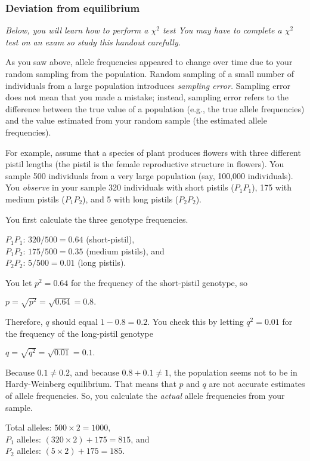 \documentclass[12pt]{exam}
\begin{document}
\begin{questions}
\subsubsection*{Deviation from equilibrium}

\emph{Below, you will learn how to perform a $\chi^2$ test You may have to complete a $\chi^2$ test on an exam so study this handout carefully.}

As you saw above, allele frequencies appeared to change over time due to your random sampling from the population. Random sampling of a small number of individuals from a large population introduces \emph{sampling error.} Sampling error does not mean that you made a mistake; instead, sampling error refers to the difference between the true value of a population (e.g., the true allele frequencies) and the value estimated from your random sample (the estimated allele frequencies). 

For example, assume that a species of plant produces flowers with three different pistil lengths (the pistil is the female reproductive structure in flowers). You sample 500 individuals from a very large population (say, 100,000 individuals). You \emph{observe} in your sample 320 individuals with short pistils ($P_1P_1$), 175 with medium pistils ($P_1P_2$), and 5 with long pistils ($P_2P_2$).

You first calculate the three genotype frequencies.

$P_1P_1$: $320/500 = 0.64$ (short-pistil),\\ 
$P_1P_2$: $175/500 = 0.35$ (medium pistils), and \\
$P_2P_2$: $5/500 = 0.01$ (long pistils).

You let $p^2 = 0.64$ for the frequency of the short-pistil genotype, so

$p = \sqrt{p^2} = \sqrt{0.64} = 0.8.$

Therefore, $q$ should equal $1 - 0.8 = 0.2$. You check this by letting $q^2 = 0.01$ for the frequency of the long-pistil genotype

$q = \sqrt{q^2} = \sqrt{0.01} = 0.1.$

Because $0.1 \neq 0.2$, and because $0.8 + 0.1 \neq 1$, the population seems not to be in Hardy-Weinberg equilibrium. That means that $p$ and $q$ are not accurate estimates of allele frequencies. So, you calculate the \emph{actual} allele frequencies from your sample.

Total alleles: $500 \times 2 = 1000,$ \\
$P_1$ alleles: $(320 \times 2) + 175 = 815$, and \\
$P_2$ alleles: $(5 \times 2) + 175 = 185$.


\end{questions}
\end{document}
